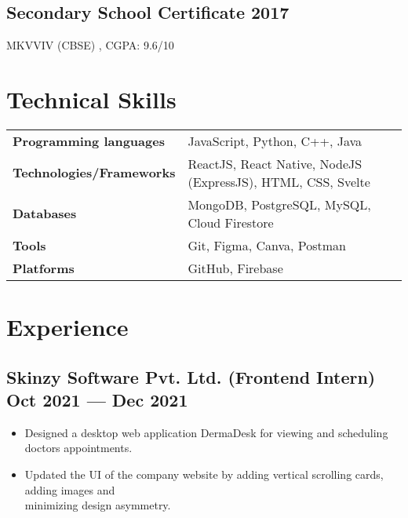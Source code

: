 \documentclass[a4,10pt]{article}
\newenvironment{zitemize}{
\begin{itemize}\itemsep0pt \parskip0pt \parsep1pt}
{\end{itemize}\vspace{-0.5cm}}
\newcommand{\hskills}[1]{
\textbf{\bfseries #1} }
\begin{document}
\subsection*{Secondary School Certificate \hfill 2017} {\normalsize \normalfont MKVVIV (CBSE) , CGPA: 9.6/10} 
\vspace{-0.5cm}


\section{Technical Skills}
\vspace{-0.2cm}
\begin{tabular}{p{12em} p{32em}}
\hskills{Programming languages} & JavaScript, Python, C++, Java \\
\hskills{Technologies/Frameworks} & ReactJS, React Native, NodeJS (ExpressJS), HTML, CSS, Svelte \\
\hskills{Databases} & MongoDB, PostgreSQL, MySQL, Cloud Firestore \\
\hskills{Tools} & Git, Figma, Canva, Postman  \\
\hskills{Platforms} & GitHub, Firebase  \\
\end{tabular}
\vspace{-0.5cm}


\section{Experience}
\vspace{-0.1cm}
\subsection*{Skinzy Software Pvt. Ltd. {\normalsize\normalfont (Frontend Intern)} \hfill Oct 2021 --- Dec 2021} 
    \begin{zitemize}
        \item Designed a desktop web application DermaDesk for viewing and
        scheduling doctors appointments.
        \item Updated the UI of the company website by adding vertical scrolling cards, adding images and\\minimizing design asymmetry.
    \end{zitemize}
\vspace{-0.1cm}
\end{document}
